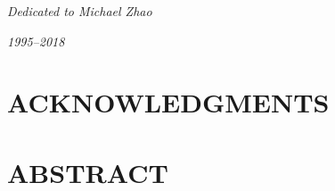 \documentclass[10pt]{report}
\begin{document}
\newenvironment{preliminary}{}{}
\titleformat{\chapter}[hang]{\large\center}{\thechapter}{0 pt}{}
\titlespacing*{\chapter}{0pt}{-33 pt}{6 pt} %
\begin{preliminary}


\setcounter{page}{3}  %
\begin{center}
$~$
\vspace{3cm}

\textit{Dedicated to Michael Zhao}

\textit{1995--2018}
\end{center}


\clearpage
\chapter*{ACKNOWLEDGMENTS}



\clearpage
\chapter*{ABSTRACT}
\begin{center}
\mytitle

\vspace{0.5cm}

\myauthor

\mysupervisorname

\end{center}

\vspace{1.5cm}


\end{preliminary}
\end{document}
